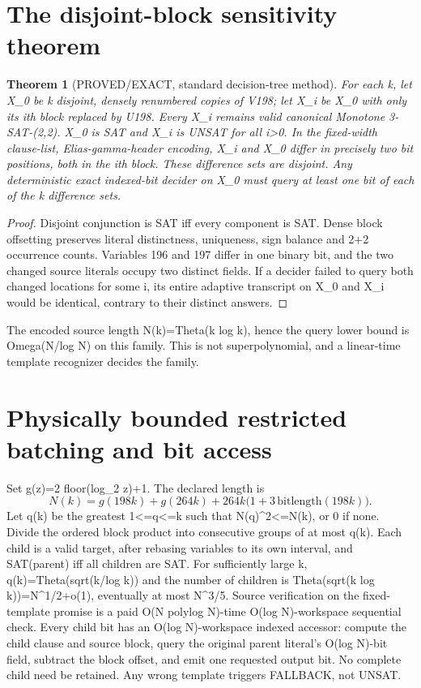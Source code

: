 \documentclass[11pt]{article}
\newtheorem{theorem}{Theorem}
\begin{document}
\section{The disjoint-block sensitivity theorem}
\begin{theorem}[PROVED/EXACT, standard decision-tree method]
For each k, let X_0 be k disjoint, densely renumbered copies of V198; let X_i be X_0 with only its ith block replaced by U198. Every X_i remains valid canonical Monotone 3-SAT-(2,2). X_0 is SAT and X_i is UNSAT for all i>0. In the fixed-width clause-list, Elias-gamma-header encoding, X_i and X_0 differ in precisely two bit positions, both in the ith block. These difference sets are disjoint. Any deterministic exact indexed-bit decider on X_0 must query at least one bit of each of the k difference sets.
\end{theorem}
\begin{proof}
Disjoint conjunction is SAT iff every component is SAT. Dense block offsetting preserves literal distinctness, uniqueness, sign balance and 2+2 occurrence counts. Variables 196 and 197 differ in one binary bit, and the two changed source literals occupy two distinct fields. If a decider failed to query both changed locations for some i, its entire adaptive transcript on X_0 and X_i would be identical, contrary to their distinct answers.
\end{proof}
The encoded source length N(k)=Theta(k log k), hence the query lower bound is Omega(N/log N) on this family. This is not superpolynomial, and a linear-time template recognizer decides the family.

\section{Physically bounded restricted batching and bit access}
Set g(z)=2 floor(log_2 z)+1. The declared length is
\[
N(k)=g(198k)+g(264k)+264k\bigl(1+3\,\mathrm{bitlength}(198k)\bigr).
\]
Let q(k) be the greatest 1<=q<=k such that N(q)^2<=N(k), or 0 if none. Divide the ordered block product into consecutive groups of at most q(k). Each child is a valid target, after rebasing variables to its own interval, and SAT(parent) iff all children are SAT. For sufficiently large k, q(k)=Theta(sqrt(k/log k)) and the number of children is Theta(sqrt(k log k))=N^{1/2+o(1)}, eventually at most N^{3/5}. Source verification on the fixed-template promise is a paid O(N polylog N)-time O(log N)-workspace sequential check. Every child bit has an O(log N)-workspace indexed accessor: compute the child clause and source block, query the original parent literal's O(log N)-bit field, subtract the block offset, and emit one requested output bit. No complete child need be retained. Any wrong template triggers FALLBACK, not UNSAT.
\end{document}
